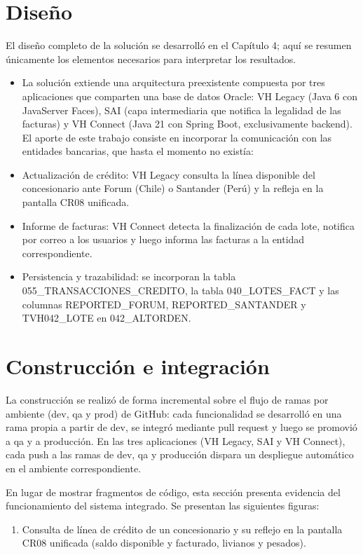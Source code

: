 \section{Diseño}

El diseño completo de la solución se desarrolló en el Capítulo 4; aquí se resumen únicamente los elementos necesarios para interpretar los resultados.

\begin{itemize}
\item
  La solución extiende una arquitectura preexistente compuesta por tres aplicaciones que comparten una base de datos Oracle: VH Legacy (Java 6 con JavaServer Faces), SAI (capa intermediaria que notifica la legalidad de las facturas) y VH Connect (Java 21 con Spring Boot, exclusivamente backend). El aporte de este trabajo consiste en incorporar la comunicación con las entidades bancarias, que hasta el momento no existía:
\item
  Actualización de crédito: VH Legacy consulta la línea disponible del concesionario ante Forum (Chile) o Santander (Perú) y la refleja en la pantalla CR08 unificada.
\item
  Informe de facturas: VH Connect detecta la finalización de cada lote, notifica por correo a los usuarios y luego informa las facturas a la entidad correspondiente.
\item
  Persistencia y trazabilidad: se incorporan la tabla 055\_TRANSACCIONES\_CREDITO, la tabla 040\_LOTES\_FACT y las columnas REPORTED\_FORUM, REPORTED\_SANTANDER y TVH042\_LOTE en 042\_ALTORDEN.
\end{itemize}

\section{Construcción e integración}

La construcción se realizó de forma incremental sobre el flujo de ramas por ambiente (dev, qa y prod) de GitHub: cada funcionalidad se desarrolló en una rama propia a partir de dev, se integró mediante pull request y luego se promovió a qa y a producción. En las tres aplicaciones (VH Legacy, SAI y VH Connect), cada push a las ramas de dev, qa y producción dispara un despliegue automático en el ambiente correspondiente.

En lugar de mostrar fragmentos de código, esta sección presenta evidencia del funcionamiento del sistema integrado. Se presentan las siguientes figuras:

\begin{enumerate}
\def\labelenumi{\arabic{enumi}.}
\item
  Consulta de línea de crédito de un concesionario y su reflejo en la pantalla CR08 unificada (saldo disponible y facturado, livianos y pesados).
\end{enumerate}

